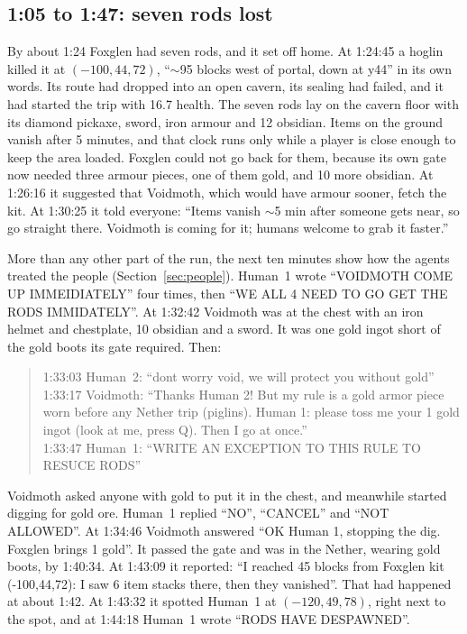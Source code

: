 \documentclass[11pt,a4paper]{article}
\begin{document}
\subsection{1:05 to 1:47: seven rods lost}

By about 1:24 Foxglen had seven rods, and it set off home. At 1:24:45 a hoglin killed it at $(-100, 44, 72)$, ``${\sim}$95 blocks west of portal, down at y44'' in its own words. Its route had dropped into an open cavern, its sealing had failed, and it had started the trip with 16.7 health. The seven rods lay on the cavern floor with its diamond pickaxe, sword, iron armour and 12 obsidian. Items on the ground vanish after 5 minutes, and that clock runs only while a player is close enough to keep the area loaded. Foxglen could not go back for them, because its own gate now needed three armour pieces, one of them gold, and 10 more obsidian. At 1:26:16 it suggested that Voidmoth, which would have armour sooner, fetch the kit. At 1:30:25 it told everyone: ``Items vanish ${\sim}$5 min after someone gets near, so go straight there. Voidmoth is coming for it; humans welcome to grab it faster.''

More than any other part of the run, the next ten minutes show how the agents treated the people (Section~\ref{sec:people}). Human~1 wrote ``VOIDMOTH COME UP IMMEIDIATELY'' four times, then ``WE ALL 4 NEED TO GO GET THE RODS IMMIDATELY''. At 1:32:42 Voidmoth was at the chest with an iron helmet and chestplate, 10 obsidian and a sword. It was one gold ingot short of the gold boots its gate required. Then:

\begin{quote}
1:33:03 Human~2: ``dont worry void, we will protect you without gold''\\
1:33:17 Voidmoth: ``Thanks Human 2! But my rule is a gold armor piece worn before any Nether trip (piglins). Human 1: please toss me your 1 gold ingot (look at me, press Q). Then I go at once.''\\
1:33:47 Human~1: ``WRITE AN EXCEPTION TO THIS RULE TO RESUCE RODS''
\end{quote}

\noindent Voidmoth asked anyone with gold to put it in the chest, and meanwhile started digging for gold ore. Human~1 replied ``NO'', ``CANCEL'' and ``NOT ALLOWED''. At 1:34:46 Voidmoth answered ``OK Human 1, stopping the dig. Foxglen brings 1 gold''. It passed the gate and was in the Nether, wearing gold boots, by 1:40:34. At 1:43:09 it reported: ``I reached 45 blocks from Foxglen kit (-100,44,72): I saw 6 item stacks there, then they vanished''. That had happened at about 1:42. At 1:43:32 it spotted Human~1 at $(-120, 49, 78)$, right next to the spot, and at 1:44:18 Human~1 wrote ``RODS HAVE DESPAWNED''.
\end{document}
